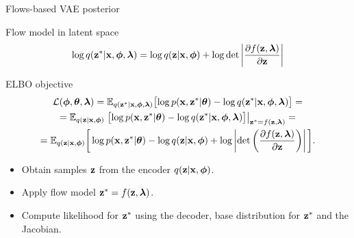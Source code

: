 \begin{frame}{Flows-based VAE posterior}
	
	\begin{block}{Flow model in latent space}
		\vspace{-0.3cm}
		\[
			\log q(\mathbf{z}^* | \mathbf{x}, \boldsymbol{\phi}, \boldsymbol{\lambda}) = \log q(\mathbf{z} | \mathbf{x}, \boldsymbol{\phi}) + \log \det \left | \frac{\partial f(\mathbf{z}, \boldsymbol{\lambda})}{\partial \mathbf{z}}\right|
		\]
		\vspace{-0.3cm}
	\end{block}
	\begin{block}{ELBO objective}
		\vspace{-0.5cm}
		\begin{multline*}
			\mathcal{L} (\boldsymbol{\phi}, \boldsymbol{\theta}, \boldsymbol{\lambda})  
			= \mathbb{E}_{q(\mathbf{z}^* | \mathbf{x}, \boldsymbol{\phi}, \boldsymbol{\lambda})} \bigl[\log p(\mathbf{x}, \mathbf{z}^* | \boldsymbol{\theta}) - \log q(\mathbf{z}^*| \mathbf{x}, \boldsymbol{\phi}, \boldsymbol{\lambda}) \bigr] = \\
			= \mathbb{E}_{q(\mathbf{z} | \mathbf{x}, \boldsymbol{\phi})} \left. \bigl[\log p(\mathbf{x}, \mathbf{z}^* | \boldsymbol{\theta}) - \log q(\mathbf{z}^*| \mathbf{x}, \boldsymbol{\phi}, \boldsymbol{\lambda}) \bigr]\right|_{\mathbf{z}^* = f(\mathbf{z}, \boldsymbol{\lambda})} = \\
			= \mathbb{E}_{q(\mathbf{z} | \mathbf{x}, \boldsymbol{\phi})} \bigg[\log p(\mathbf{x}, \mathbf{z}^* | \boldsymbol{\theta}) -  \log q(\mathbf{z} | \mathbf{x}, \boldsymbol{\phi} ) + \log \left| \det \left( \frac{\partial f(\mathbf{z}, \boldsymbol{\lambda})}{\partial \mathbf{z}} \right) \right| \bigg].
		\end{multline*}
	\end{block}
	\begin{itemize}
		\item Obtain samples $\mathbf{z}$ from the encoder $q(\mathbf{z} | \mathbf{x}, \boldsymbol{\phi})$.
		\item Apply flow model $\mathbf{z}^* = f(\mathbf{z}, \boldsymbol{\lambda})$.
		\item Compute likelihood for $\mathbf{z}^*$ using the decoder, base distribution for $\mathbf{z}^*$ and the Jacobian.
	\end{itemize}
\end{frame}
